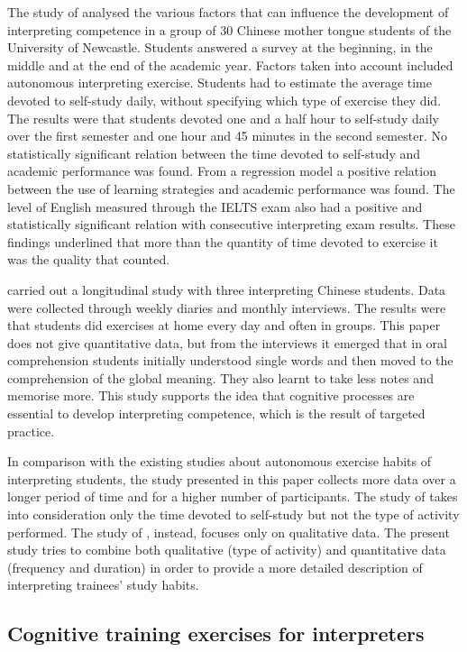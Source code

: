 \documentclass[output=paper]{../langscibook}
\begin{document}
The study of \citet{Fan2012} analysed the various factors that can influence the development of interpreting competence in a group of 30 Chinese mother tongue students of the University of Newcastle. Students answered a survey at the beginning, in the middle and at the end of the academic year. Factors taken into account included autonomous interpreting exercise. Students had to estimate the average time devoted to self-study daily, without specifying which type of exercise they did. The results were that students devoted one and a half hour to self-study daily over the first semester and one hour and 45 minutes in the second semester. No statistically significant relation between the time devoted to self-study and academic performance was found. From a regression model a positive relation between the use of learning strategies and academic performance was found. The level of English measured through the IELTS exam also had a positive and statistically significant relation with consecutive interpreting exam results. These findings underlined that more than the quantity of time devoted to exercise it was the quality that counted.

\citet{Wang2016} carried out a longitudinal study with three interpreting Chinese students. Data were collected through weekly diaries and monthly interviews. The results were that students did exercises at home every day and often in groups. This paper does not give quantitative data, but from the interviews it emerged that in oral comprehension students initially understood single words and then moved to the comprehension of the global meaning. They also learnt to take less notes and memorise more. This study supports the idea that cognitive processes are essential to develop interpreting competence, which is the result of targeted practice.

In comparison with the existing studies about autonomous exercise habits of interpreting students, the study presented in this paper collects more data over a longer period of time and for a higher number of participants. The study of \citet{Fan2012} takes into consideration only the time devoted to self-study but not the type of activity performed. The study of \citet{Wang2016}, instead, focuses only on qualitative data. The present study tries to combine both qualitative (type of activity) and quantitative data (frequency and duration) in order to provide a more detailed description of interpreting trainees’ study habits.



\subsection{Cognitive training exercises for interpreters}
\label{sec:ghiselli:2.3}
\end{document}
